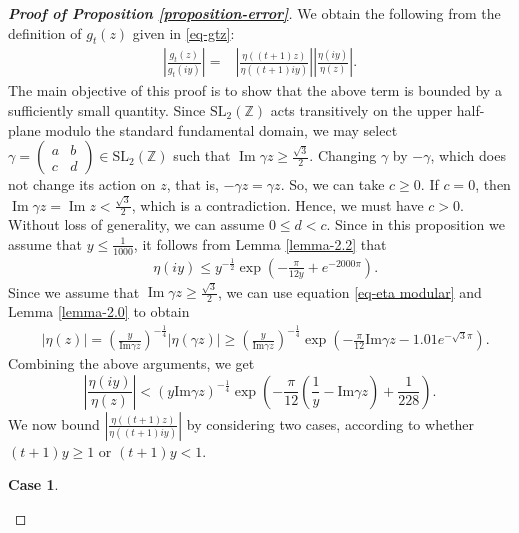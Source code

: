 \documentclass[11pt]{amsart}
\theoremstyle{plain}
\newtheorem{case}[]{Case}
\renewcommand{\Im}{\operatorname{Im}}
\numberwithin{equation}{section}
\begin{document}
	\begin{proof}[\textbf{\boldmath Proof of Proposition \ref{proposition-error}}]
		We obtain the following from the definition of $g_t(z)$ given in \eqref{eq-gtz}:
		\begin{align}\label{eq-gtz1}
			\left|\frac{g_{t}(z)}{g_t(iy)}\right|=&\left|\frac{\eta((t+1)z)}{\eta((t+1)iy)}\right| \left|\frac{\eta(iy)}{\eta(z)}\right|.
		\end{align}
		The main objective of this proof is to show that the above term is bounded by a sufficiently small quantity. 
		Since $\text{SL}_2(\mathbb{Z})$ acts transitively on the upper half-plane modulo the standard fundamental domain, we may select 
		$\gamma=\begin{pmatrix} a & b \\ c & d \end{pmatrix}\in \text{SL}_2(\mathbb{Z})$ 
		such that $\operatorname{Im}\gamma z\ge \frac{\sqrt{3}}{2}$.
		Changing $\gamma$ by $-\gamma$, which does not change its action on $z$, that is, $-\gamma z=\gamma z$. So, we can take $c\ge0.$ If $c=0$, then $\Im \gamma z=\Im z<\frac{\sqrt{3}}{2}$, which is a contradiction. Hence, we must have $c>0$. Without loss of generality, we can assume $0\le d<c$.
		Since in this proposition we assume that $y \le \frac{1}{1000}$, it follows from Lemma \ref{lemma-2.2} that
		\begin{align*}
			&\eta(iy)\le y^{-\frac{1}{2}}\exp\left(-\frac{\pi}{12y}+e^{-2000\pi}\right).  
		\end{align*}
		Since we assume that $\Im \gamma z \ge \frac{\sqrt{3}}{2}$, we can use equation \eqref{eq-eta modular} and Lemma \ref{lemma-2.0} to obtain
		\begin{align*}
			&|\eta(z)|=\left(\frac{y}{\text{Im}\gamma z}\right)^{-\frac{1}{4}}|\eta(\gamma z)|\ge\left(\frac{y}{\text{Im}\gamma z}\right)^{-\frac{1}{4}}\exp\left(-\frac{\pi}{12}\text{Im}\gamma z-1.01e^{-\sqrt{3}\pi}\right).   
		\end{align*}
		Combining the above arguments, we get
		\begin{equation}\label{eq-P2}
			\left|\frac{\eta(iy)}{\eta(z)}\right|<(y\text{Im}\gamma z)^{-\frac{1}{4}}\exp\left(-\frac{\pi}{12}\left(\frac{1}{y}-\text{Im}\gamma z\right)+\frac{1}{228}\right).  
		\end{equation}
		We now bound $\left|\frac{\eta((t+1)z)}{\eta((t+1)iy)}\right|$ by considering two cases, according to whether $(t+1)y \ge 1$ or $(t+1)y < 1$.
		\begin{case}\label{claim-3.11}

\end{case}
\end{proof}
\end{document}
